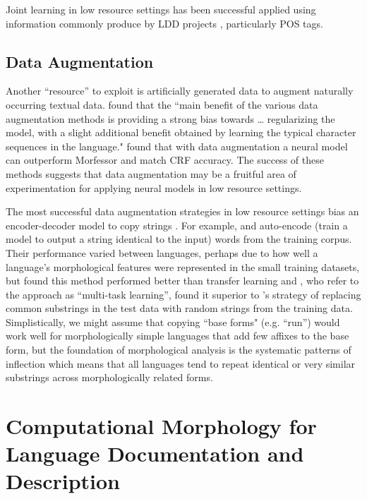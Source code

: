\documentclass[12pt]{article}
\begin{document}
Joint learning in low resource settings has been successful applied using information commonly produce by LDD projects \cite{palmer_semi-automated_2009,moeller_automatic_2018}, particularly POS tags.

\subsection{Data Augmentation}
\label{augment}

Another ``resource'' to exploit is artificially generated data to augment naturally occurring textual data.  found that the ``main benefit of the various data augmentation methods is providing a strong bias towards … regularizing the model, with a slight additional benefit obtained by learning the typical character sequences in the language."  found that with data augmentation a neural model can outperform Morfessor and match CRF accuracy. The success of these methods suggests that data augmentation may be a fruitful area of experimentation for applying neural models in low resource settings.

The most successful data augmentation strategies in low resource settings bias an encoder-decoder model to copy strings \cite{bergmanis_training_2017,kann_fortification_2018,makarov_align_2017,makarov_uzh_2018}. For example,  and  auto-encode (train a model to output a string identical to the input) words from the training corpus. Their performance varied between languages, perhaps due to how well a language’s morphological features were represented in the small training datasets, but  found this method performed better than transfer learning and , who refer to the approach as ``multi-task learning'', found it superior to 's strategy of replacing common substrings in the test data with random strings from the training data.  Simplistically, we might assume that copying ``base forms" (e.g. ``run'') would work well for morphologically simple languages that add few affixes to the base form, but the foundation of morphological analysis is the systematic patterns of inflection which means that all languages tend to repeat identical or very similar substrings across morphologically related forms. 

\section{Computational Morphology for Language Documentation and Description}
\label{CLLDD}
\end{document}

